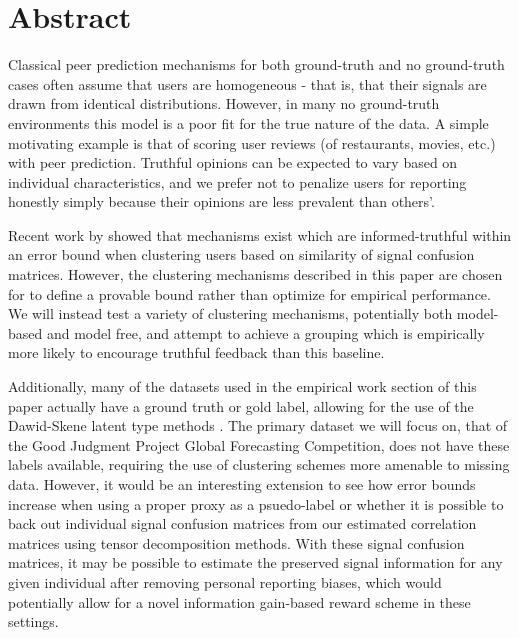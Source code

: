 \documentclass[a4paper, 11pt]{article}
\begin{document}
\maketitle


\section{Abstract}
% 
Classical peer prediction mechanisms for both ground-truth and no ground-truth cases often assume that users are homogeneous - that is, that their signals are drawn from identical distributions. However, in many no ground-truth environments this model is a poor fit for the true nature of the data. A simple motivating example is that of scoring user reviews (of restaurants, movies, etc.) with peer prediction. Truthful opinions can be expected to vary based on individual characteristics, and we prefer not to penalize users for reporting honestly simply because their opinions are less prevalent than others'.

Recent work by \citet{agarwal2017peer} showed that mechanisms exist which are informed-truthful within an error bound when clustering users based on similarity of signal confusion matrices. However, the clustering mechanisms described in this paper are chosen for to define a provable bound rather than optimize for empirical performance. We will instead test a variety of clustering mechanisms, potentially both model-based and model free, and attempt to achieve a grouping which is empirically more likely to encourage truthful feedback than this baseline.

Additionally, many of the datasets used in the empirical work section of this paper actually have a ground truth or gold label, allowing for the use of the Dawid-Skene latent type methods \citep{dawid1979maximum}. The primary dataset we will focus on, that of the Good Judgment Project Global Forecasting Competition, does not have these labels available, requiring the use of clustering schemes more amenable to missing data. However, it would be an interesting extension to see how error bounds increase when using a proper proxy \citep{witkowski2017proper} as a psuedo-label or whether it is possible to back out individual signal confusion matrices from our estimated correlation matrices using tensor decomposition methods. With these signal confusion matrices, it may be possible to estimate the preserved signal information for any given individual after removing personal  reporting biases, which would potentially allow for a novel information gain-based reward scheme in these settings.
\end{document}
